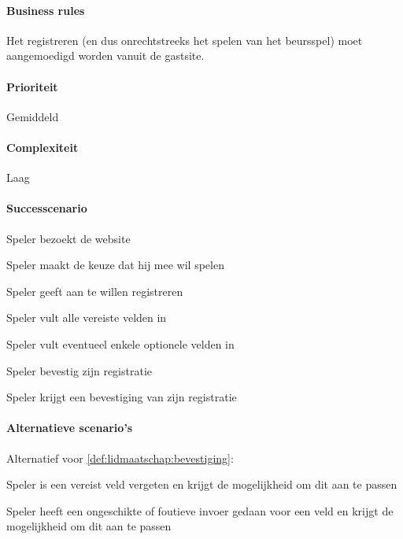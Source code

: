 \begin{compact}
\paragraph{Business rules}Het registreren (en dus onrechtstreeks het spelen van het beursspel) moet aangemoedigd worden vanuit de gastsite.
\paragraph{Prioriteit}Gemiddeld
\paragraph{Complexiteit}Laag
\paragraph{Successcenario}
\begin{enumerate_compact}
 \item Speler bezoekt de website
 \item Speler maakt de keuze dat hij mee wil spelen
 \item Speler geeft aan te willen registreren
 \item Speler vult alle vereiste velden in
 \item Speler vult eventueel enkele optionele velden in
 \item Speler bevestig zijn registratie
 \item \label{def:lidmaatschap:bevestiging} Speler krijgt een bevestiging van zijn registratie
\end{enumerate_compact}
\paragraph{Alternatieve scenario's}
Alternatief voor \ref{def:lidmaatschap:bevestiging}:
\begin{itemize_compact}
 \item Speler is een vereist veld vergeten en krijgt de mogelijkheid om dit aan te passen
 \item Speler heeft een ongeschikte of foutieve invoer gedaan voor een veld en krijgt de mogelijkheid om dit aan te passen
\end{itemize_compact}
\end{compact}
 
